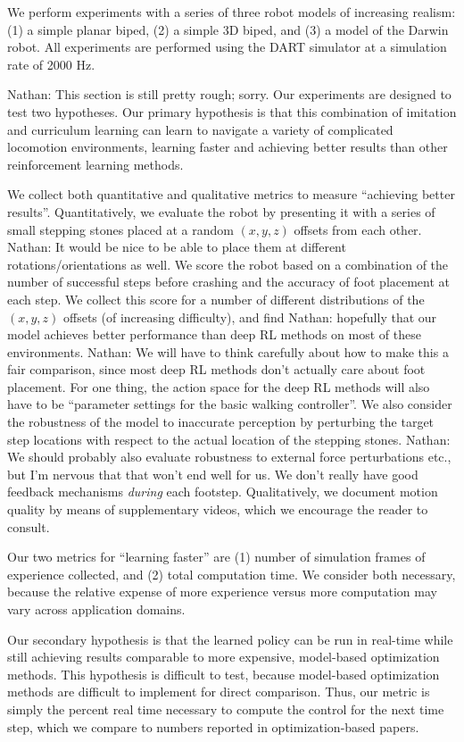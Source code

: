 \documentclass[a4paper]{article}
\newcommand{\nhatch}[1]{{\leavevmode\color{blue} Nathan: #1}}
\begin{document}
We perform experiments with a series of three robot models of increasing realism: (1) a simple planar biped, (2) a simple 3D biped, and (3) a model of the Darwin robot.
All experiments are performed using the DART simulator at a simulation rate of 2000 Hz.

\nhatch{This section is still pretty rough; sorry.}
Our experiments are designed to test two hypotheses.
Our primary hypothesis is that this combination of imitation and curriculum learning can learn to navigate a variety of complicated locomotion environments, learning faster and achieving better results than other reinforcement learning methods.

We collect both quantitative and qualitative metrics to measure ``achieving better results''.
Quantitatively, we evaluate the robot by presenting it with a series of small stepping stones placed at a random $(x,y,z)$ offsets from each other.
\nhatch{It would be nice to be able to place them at different rotations/orientations as well.}
We score the robot based on a combination of the number of successful steps before crashing and the accuracy of foot placement at each step.
We collect this score for a number of different distributions of the $(x,y,z)$ offsets (of increasing difficulty), and find \nhatch{hopefully} that our model achieves better performance than deep RL methods on most of these environments.
\nhatch{We will have to think carefully about how to make this a fair comparison, since most deep RL methods don't actually care about foot placement. For one thing, the action space for the deep RL methods will also have to be ``parameter settings for the basic walking controller''.}
We also consider the robustness of the model to inaccurate perception by perturbing the target step locations with respect to the actual location of the stepping stones.
\nhatch{We should probably also evaluate robustness to external force perturbations etc., but I'm nervous that that won't end well for us. We don't really have good feedback mechanisms \emph{during} each footstep.}
Qualitatively, we document motion quality by means of supplementary videos, which we encourage the reader to consult.

Our two metrics for ``learning faster'' are (1) number of simulation frames of experience collected, and (2) total computation time.
We consider both necessary, because the relative expense of more experience versus more computation may vary across application domains.

Our secondary hypothesis is that the learned policy can be run in real-time while still achieving results comparable to more expensive, model-based optimization methods.
This hypothesis is difficult to test, because model-based optimization methods are difficult to implement for direct comparison.
Thus, our metric is simply the percent real time necessary to compute the control for the next time step, which we compare to numbers reported in optimization-based papers.
\end{document}
